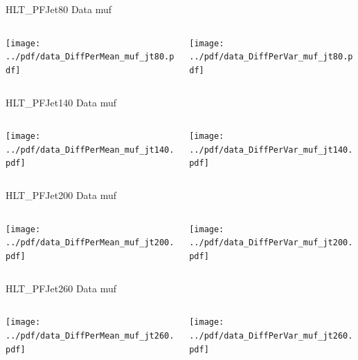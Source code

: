 \documentclass[9pt]{beamer}
\begin{document}
\begin{frame}[t]{HLT\_PFJet80 Data muf}
\begin{columns}[T]
  \begin{column}{.5\textwidth}
  \texttt{[image: ../pdf/data\_DiffPerMean\_muf\_jt80.pdf]}
  \end{column}
  \begin{column}{.5\textwidth}
  \texttt{[image: ../pdf/data\_DiffPerVar\_muf\_jt80.pdf]}
  \end{column}
\end{columns}
\end{frame}

\begin{frame}[t]{HLT\_PFJet140 Data muf}
\begin{columns}[T]
  \begin{column}{.5\textwidth}
  \texttt{[image: ../pdf/data\_DiffPerMean\_muf\_jt140.pdf]}
  \end{column}
  \begin{column}{.5\textwidth}
  \texttt{[image: ../pdf/data\_DiffPerVar\_muf\_jt140.pdf]}
  \end{column}
\end{columns}
\end{frame}

\begin{frame}[t]{HLT\_PFJet200 Data muf}
\begin{columns}[T]
  \begin{column}{.5\textwidth}
  \texttt{[image: ../pdf/data\_DiffPerMean\_muf\_jt200.pdf]}
  \end{column}
  \begin{column}{.5\textwidth}
  \texttt{[image: ../pdf/data\_DiffPerVar\_muf\_jt200.pdf]}
  \end{column}
\end{columns}
\end{frame}

\begin{frame}[t]{HLT\_PFJet260 Data muf}
\begin{columns}[T]
  \begin{column}{.5\textwidth}
  \texttt{[image: ../pdf/data\_DiffPerMean\_muf\_jt260.pdf]}
  \end{column}
  \begin{column}{.5\textwidth}
  \texttt{[image: ../pdf/data\_DiffPerVar\_muf\_jt260.pdf]}
  \end{column}
\end{columns}
\end{frame}
\end{document}
